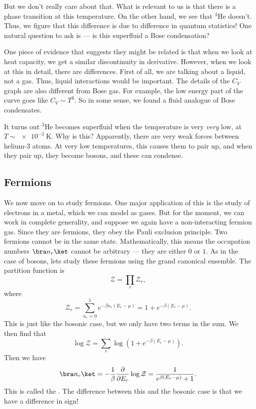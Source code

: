 \documentclass[a4paper]{article}
\begin{document}
But we don't really care about that. What is relevant to us is that there is a phase transition at this temperature. On the other hand, we see that $^3$He doesn't. Thus, we figure that this difference is due to difference in quantum statistics! One natural question to ask is --- is this superfluid a Bose condensation?

One piece of evidence that suggests they might be related is that when we look at heat capacity, we get a similar discontinuity in derivative. However, when we look at this in detail, there are differences. First of all, we are talking about a liquid, not a gas. Thus, liquid interactions would be important. The details of the $C_V$ graph are also different from Bose gas. For example, the low energy part of the curve goes like $C_V \sim T^3$. So in some sense, we found a fluid analogue of Bose condensates.

It turns out $^3$He becomes superfluid when the temperature is very \emph{very} low, at $T \sim \SI{e-3}{\kelvin}$. Why is this? Apparently, there are very weak forces between helium-3 atoms. At very low temperatures, this causes them to pair up, and when they pair up, they become bosons, and these can condense.

\subsection{Fermions}
We now move on to study fermions. One major application of this is the study of electrons in a metal, which we can model as gases. But for the moment, we can work in complete generality, and suppose we again have a non-interacting fermion gas. Since they are fermions, they obey the Pauli exclusion principle. Two fermions cannot be in the same state. Mathematically, this means the occupation numbers $\bra n_r\ket$ cannot be arbitrary --- they are either $0$ or $1$. As in the case of bosons, lets study these fermions using the grand canonical ensemble. The partition function is
\[
  \mathcal{Z} = \prod_r \mathcal{Z}_r,
\]
where
\[
  \mathcal{Z}_r = \sum_{n_r = 0}^1 e^{-\beta n_r (E_r - \mu)} = 1 + e^{-\beta (E_r - \mu)}.
\]
This is just like the bosonic case, but we only have two terms in the sum. We then find that
\[
  \log \mathcal{Z} = \sum_r \log (1 + e^{-\beta (E_r - \mu)}).
\]
Then we have
\[
  \bra n_r\ket = -\frac{1}{\beta} \frac{\partial}{\partial E_r} \log \mathcal{Z} = \frac{1}{e^{\beta(E_r - \mu)} + 1}.
\]
This is called the . The difference between this and the bosonic case is that we have a difference in sign!
\end{document}
